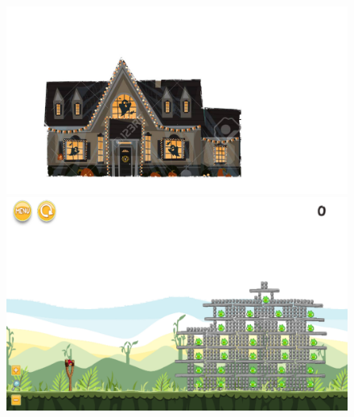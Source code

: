 \documentclass{dalthesis}
\begin{document}
\begin{figure}
  \includegraphics[width=\textwidth,height=\textheight,keepaspectratio]{levels/pictures/halloween/haunted_house.jpg}
  \includegraphics[width=\textwidth,height=\textheight,keepaspectratio]{levels/screenshots/halloween/haunted_house.png}
\end{figure}
\end{document}
